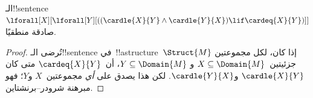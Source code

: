 \documentclass[../../../include/open-logic-section]{subfiles}
\begin{document}
\begin{prop}
الـ!!{sentence}~$\lforall[X][\lforall[Y][((\cardle{X}{Y} \land
    \cardle{Y}{X}) \lif \cardeq{X}{Y})]]$ صادقة منطقيًا.
\end{prop}

\begin{proof}
تُرضى الـ!!{sentence} في~!!a{structure}~$\Struct{M}$ إذا كان، لكل
مجموعتين جزئيتين~$X \subseteq \Domain{M}$ و
$Y \subseteq \Domain{M}$، أن~$\cardeq{X}{Y}$ متى كان
$\cardle{X}{Y}$ و$\cardle{Y}{X}$. لكن هذا يصدق على \emph{أي}
مجموعتين~$X$ و$Y$؛ فهو مبرهنة شرودر--برنشتاين.
\end{proof}
\end{document}
